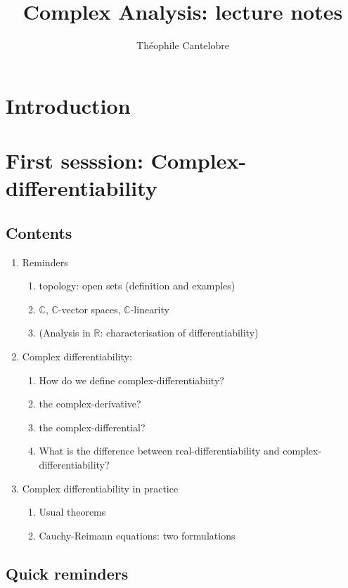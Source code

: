 \documentclass{article}
\title{Complex Analysis: lecture notes}
\author{Th\'eophile Cantelobre}
\begin{document}
\maketitle
\section{Introduction}


\newpage
\section{First sesssion: Complex-differentiability} 
\subsection*{Contents}
\begin{enumerate}
    \item Reminders
        \begin{enumerate}
            \item topology: open sets (definition and examples)
            \item $\mathbb{C}$, $\mathbb{C}$-vector spaces, $\mathbb{C}$-linearity
            \item (Analysis in $\mathbb{R}$: characterisation of differentiability)
        \end{enumerate}
    \item Complex differentiability:
    \begin{enumerate}
        \item How do we define complex-differentiabiity? 
        \item the complex-derivative? 
        \item the complex-differential? 
        \item What is the difference between real-differentiability and complex-differentiability?
     \end{enumerate}
        
    \item Complex differentiability in practice
    \begin{enumerate}
        \item Usual theorems
        \item Cauchy-Reimann equations: two formulations
    \end{enumerate}
\end{enumerate}

\subsection{Quick reminders}
\end{document}
